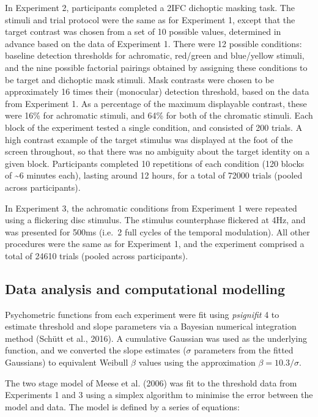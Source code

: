 \documentclass[
  letterpaper,
  DIV=11,
  numbers=noendperiod]{scrartcl}
\begin{document}
In Experiment 2, participants completed a 2IFC dichoptic masking task.
The stimuli and trial protocol were the same as for Experiment 1, except
that the target contrast was chosen from a set of 10 possible values,
determined in advance based on the data of Experiment 1. There were 12
possible conditions: baseline detection thresholds for achromatic,
red/green and blue/yellow stimuli, and the nine possible factorial
pairings obtained by assigning these conditions to be target and
dichoptic mask stimuli. Mask contrasts were chosen to be approximately
16 times their (monocular) detection threshold, based on the data from
Experiment 1. As a percentage of the maximum displayable contrast, these
were 16\% for achromatic stimuli, and 64\% for both of the chromatic
stimuli. Each block of the experiment tested a single condition, and
consisted of 200 trials. A high contrast example of the target stimulus
was displayed at the foot of the screen throughout, so that there was no
ambiguity about the target identity on a given block. Participants
completed 10 repetitions of each condition (120 blocks of
\textasciitilde6 minutes each), lasting around 12 hours, for a total of
72000 trials (pooled across participants).

In Experiment 3, the achromatic conditions from Experiment 1 were
repeated using a flickering disc stimulus. The stimulus counterphase
flickered at 4Hz, and was presented for 500ms (i.e.~2 full cycles of the
temporal modulation). All other procedures were the same as for
Experiment 1, and the experiment comprised a total of 24610 trials
(pooled across participants).

\hypertarget{data-analysis-and-computational-modelling}{%
\subsection{Data analysis and computational
modelling}\label{data-analysis-and-computational-modelling}}

Psychometric functions from each experiment were fit using
\emph{psignifit} 4 to estimate threshold and slope parameters via a
Bayesian numerical integration method (Schütt et al., 2016). A
cumulative Gaussian was used as the underlying function, and we
converted the slope estimates (\(\sigma\) parameters from the fitted
Gaussians) to equivalent Weibull \(\beta\) values using the
approximation \(\beta = 10.3/\sigma\).

The two stage model of Meese et al. (2006) was fit to the threshold data
from Experiments 1 and 3 using a simplex algorithm to minimise the error
between the model and data. The model is defined by a series of
equations:
\end{document}
